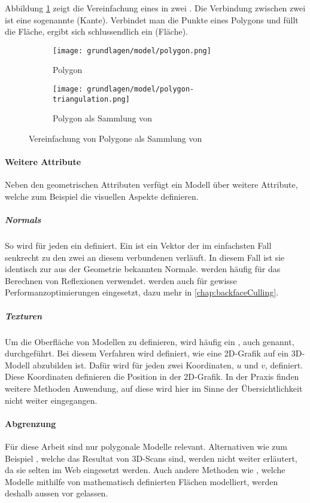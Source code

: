 Abbildung \ref{fig:modelSimpleTriangulation} zeigt die Vereinfachung eines  in zwei . Die Verbindung zwischen zwei  ist eine sogenannte  (Kante).
Verbindet man die Punkte eines Polygons und füllt die Fläche, ergibt sich schlussendlich ein  (Fläche).

\begin{figure}[H]
  \centering
  \begin{subfigure}{.5\textwidth}
    \centering
    \texttt{[image: grundlagen/model/polygon.png]}
    \caption{Polygon}
  \end{subfigure}%
  \begin{subfigure}{.5\textwidth}
    \centering
    \texttt{[image: grundlagen/model/polygon-triangulation.png]}
    \caption{Polygon als Sammlung von }
  \end{subfigure}
  \caption{Vereinfachung von Polygone als Sammlung von }
  \label{fig:modelSimpleTriangulation}
\end{figure}

\paragraph{Weitere Attribute}
Neben den geometrischen Attributen verfügt ein Modell über weitere Attribute, welche zum Beispiel die visuellen Aspekte definieren.

\subparagraph{Normals}

So wird für jeden  ein  definiert. Ein  ist ein Vektor der im einfachsten Fall senkrecht zu den zwei an diesem  verbundenen  verläuft. In diesem Fall ist sie identisch zur aus der Geometrie bekannten Normale.  werden häufig für das Berechnen von Reflexionen verwendet.
 werden auch für gewisse Performanzoptimierungen eingesetzt, dazu mehr in \autoref{chap:backfaceCulling}.

\subparagraph{Texturen}
Um die Oberfläche von Modellen zu definieren, wird häufig ein , auch  genannt, durchgeführt. Bei diesem Verfahren wird definiert, wie eine 2D-Grafik auf ein 3D-Modell abzubilden ist. Dafür wird für jeden  zwei Koordinaten, $u$ und $v$, definiert. Diese Koordinaten definieren die Position in der 2D-Grafik. In der Praxis finden weitere Methoden Anwendung, auf diese wird hier im Sinne der Übersichtlichkeit nicht weiter eingegangen.

\paragraph{Abgrenzung}
Für diese Arbeit sind nur polygonale Modelle relevant.
Alternativen wie zum Beispiel , welche das Resultat von 3D-Scans sind, werden nicht weiter erläutert, da sie selten im Web eingesetzt werden. Auch andere Methoden wie , welche Modelle mithilfe von mathematisch definierten Flächen modelliert, werden deshalb aussen vor gelassen.

